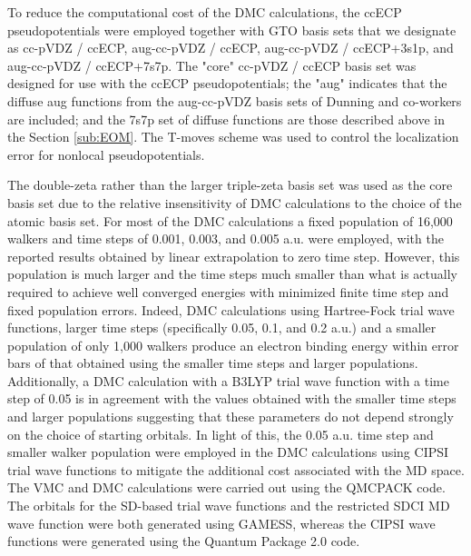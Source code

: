 To reduce the computational cost of the DMC calculations, the ccECP pseudopotentials\cite{ccecp_1,ccecp_2} were employed together with GTO basis sets that we designate as cc-pVDZ / ccECP, aug-cc-pVDZ / ccECP, aug-cc-pVDZ / ccECP+3s1p, and aug-cc-pVDZ / ccECP+7s7p. 
The "core" cc-pVDZ / ccECP\cite{ccecp_1,ccecp_2} basis set was designed for use with the ccECP pseudopotentials; the "aug" indicates that the diffuse aug functions from the aug-cc-pVDZ basis sets of Dunning and co-workers are included; and the 7s7p set of diffuse functions are those described above in the Section \ref{sub:EOM}.\cite{aug_for_cc-pVDTQZ}
The T-moves scheme was used to control the localization error for nonlocal pseudopotentials.\cite{casula_beyond_2006}

The double-zeta rather than the larger triple-zeta basis set was used as the core basis set due to the relative insensitivity of DMC calculations to the choice of the atomic basis set. 
For most of the DMC calculations a fixed population of 16,000 walkers and time steps of 0.001, 0.003, and 0.005 a.u. were employed, with the reported results obtained by linear extrapolation to zero time step.
However, this population is much larger and the time steps much smaller than what is actually required to achieve well converged energies with minimized finite time step and fixed population errors.
Indeed, DMC calculations using Hartree-Fock trial wave functions, larger time steps (specifically 0.05, 0.1, and 0.2 a.u.) and a smaller population of only 1,000 walkers produce an electron binding energy within error bars of that obtained using the smaller time steps and larger populations.
Additionally, a DMC calculation with a B3LYP trial wave function with a time step of 0.05 is in agreement with the values obtained with the smaller time steps and larger populations suggesting that these parameters do not depend strongly on the choice of starting orbitals.
In light of this, the 0.05 a.u. time step and smaller walker population were employed in the DMC calculations using CIPSI trial wave functions to mitigate the additional cost associated with the MD space. 
The VMC and DMC calculations were carried out using the QMCPACK code.\cite{QMCPACK_1,QMCPACK_2}
The orbitals for the SD-based trial wave functions and the restricted SDCI MD wave function were both generated using GAMESS,\cite{gamess_1,gamess_2,gamess_3} whereas the CIPSI wave functions were generated using the Quantum Package 2.0 code.\cite{QP2} 

